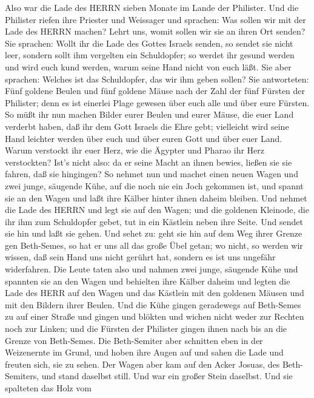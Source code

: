  Also war die Lade des HERRN sieben Monate im Lande der
Philister.  Und die Philister riefen ihre Priester und
Weissager und sprachen: Was sollen wir mit der Lade des HERRN machen?
Lehrt uns, womit sollen wir sie an ihren Ort senden?  Sie
sprachen: Wollt ihr die Lade des Gottes Israels senden, so sendet sie
nicht leer, sondern sollt ihm vergelten ein Schuldopfer; so werdet ihr
gesund werden und wird euch kund werden, warum seine Hand nicht von euch
läßt.  Sie aber sprachen: Welches ist das Schuldopfer, das
wir ihm geben sollen? Sie antworteten: Fünf goldene Beulen und fünf
goldene Mäuse nach der Zahl der fünf Fürsten der Philister; denn es ist
einerlei Plage gewesen über euch alle und über eure Fürsten.
 So müßt ihr nun machen Bilder eurer Beulen und eurer Mäuse,
die euer Land verderbt haben, daß ihr dem Gott Israels die Ehre gebt;
vielleicht wird seine Hand leichter werden über euch und über euren Gott
und über euer Land.  Warum verstockt ihr euer Herz, wie die
Ägypter und Pharao ihr Herz verstockten? Ist's nicht also: da er seine
Macht an ihnen bewies, ließen sie sie fahren, daß sie hingingen?
 So nehmet nun und machet einen neuen Wagen und zwei junge,
säugende Kühe, auf die noch nie ein Joch gekommen ist, und spannt sie an
den Wagen und laßt ihre Kälber hinter ihnen daheim bleiben. 
Und nehmet die Lade des HERRN und legt sie auf den Wagen; und die
goldenen Kleinode, die ihr ihm zum Schuldopfer gebet, tut in ein
Kästlein neben ihre Seite. Und sendet sie hin und laßt sie gehen.
 Und sehet zu: geht sie hin auf dem Weg ihrer Grenze gen
Beth-Semes, so hat er uns all das große Übel getan; wo nicht, so werden
wir wissen, daß sein Hand uns nicht gerührt hat, sondern es ist uns
ungefähr widerfahren.  Die Leute taten also und nahmen zwei
junge, säugende Kühe und spannten sie an den Wagen und behielten ihre
Kälber daheim  und legten die Lade des HERR auf den Wagen
und das Kästlein mit den goldenen Mäusen und mit den Bildern ihrer
Beulen.  Und die Kühe gingen geradewegs auf Beth-Semes zu
auf einer Straße und gingen und blökten und wichen nicht weder zur
Rechten noch zur Linken; und die Fürsten der Philister gingen ihnen nach
bis an die Grenze von Beth-Semes.  Die Beth-Semiter aber
schnitten eben in der Weizenernte im Grund, und hoben ihre Augen auf und
sahen die Lade und freuten sich, sie zu sehen.  Der Wagen
aber kam auf den Acker Josuas, des Beth-Semiters, und stand daselbst
still. Und war ein großer Stein daselbst. Und sie spalteten das Holz vom
